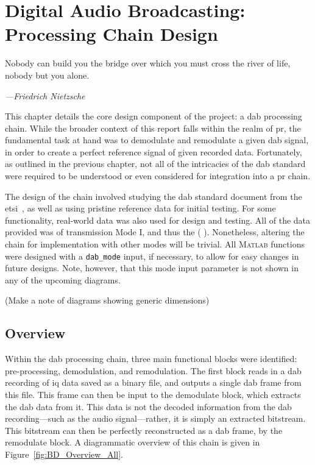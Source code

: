 \documentclass[class=report,11pt,crop=false]{standalone}
\begin{document}
\ifstandalone
\tableofcontents
\fi
\chapter{Digital Audio Broadcasting: Processing Chain Design \label{ch:dab-processing}}
\epigraph{Nobody can build you the bridge over which you must cross the river of life, nobody but you alone.}%
    {\emph{---Friedrich Nietzsche}}

This chapter details the core design component of the project: a \gls{dab} processing chain. While the broader context of this report falls within the realm of \gls{pr}, the fundamental task at hand was to demodulate and remodulate a given \gls{dab} signal, in order to create a perfect reference signal of given recorded data. Fortunately, as outlined in the previous chapter, not all of the intricacies of the \gls{dab} standard were required to be understood or even considered for integration into a \gls{pr} chain.

The design of the chain involved studying the \gls{dab} standard document from the \gls{etsi}~\cite{dabstandard}, as well as using pristine reference data for initial testing. For some functionality, real-world data was also used for design and testing. All of the data provided was of transmission Mode I, and thus the ( ). Nonetheless, altering the chain for implementation with other modes will be trivial. All \textsc{Matlab} functions were designed with a \texttt{dab\_mode} input, if necessary, to allow for easy changes in future designs. Note, however, that this mode input parameter is not shown in any of the upcoming diagrams.

(Make a note of diagrams showing generic dimensions)

\section{Overview}
Within the \gls{dab} processing chain, three main functional blocks were identified: pre-processing, demodulation, and remodulation. The first block reads in a \gls{dab} recording of \gls{iq} data saved as a binary file, and outputs a single \gls{dab} frame from this file. This frame can then be input to the demodulate block, which extracts the \gls{dab} data from it. This data is not the decoded information from the \gls{dab} recording---such as the audio signal---rather, it is simply an extracted bitstream. This bitstream can then be perfectly reconstructed as a \gls{dab} frame, by the remodulate block. A diagrammatic overview of this chain is given in Figure~\ref{fig:BD_Overview_All}.
\end{document}
